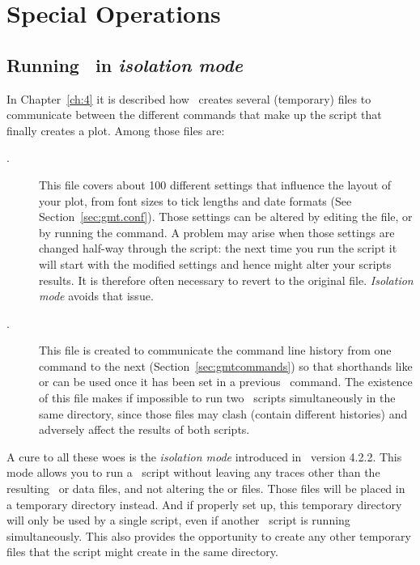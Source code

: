 %
%

\chapter{Special Operations}
\label{app:P}
\thispagestyle{headings}

\section{Running \gmt\ in \emph{isolation mode}}
\label{sec:isolationmode}
In Chapter~\ref{ch:4} it is described how \GMT\ creates several (temporary) files to
communicate between the different commands that make up the script that finally
creates a plot. Among those files are:
\begin{description}
\item[.] This file covers about 100 different settings
that influence the layout of your plot, from font sizes to tick lengths and
date formats (See Section~\ref{sec:gmt.conf}). Those settings can be altered
by editing the file, or by running the  command. A problem may
arise when those settings are changed half-way through the script: the next
time you run the script it will start with the modified settings and hence might
alter your scripts results. It is therefore often necessary to revert to the
original  file. \emph{Isolation mode} avoids that issue.
\item[.] This file is created to communicate the
command line history from one command to the next (Section~\ref{sec:gmtcommands})
so that shorthands like  or  can be used once it has been set in
a previous \GMT\ command.  The existence of this file makes if impossible to run
two \GMT\ scripts simultaneously in the same directory, since those 
files may clash (contain different histories) and adversely affect the results of both scripts.
\end{description}

A cure to all these woes is the \emph{isolation mode} introduced in \GMT\ version
4.2.2. This mode allows you to run a \GMT\ script without leaving any traces other
than the resulting \PS\  or data files, and not altering the 
or  files. Those files will be placed in a temporary directory
instead. And if properly set up, this temporary directory will only be used by a
single script, even if another \GMT\ script is running simultaneously. This also
provides the opportunity to create any other temporary files that the script might
create in the same directory.

